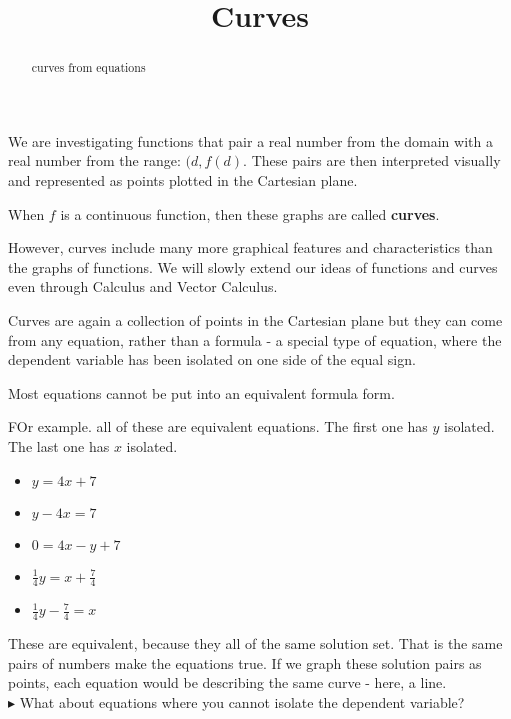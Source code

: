 \documentclass{ximera}
\title{Curves}
\begin{document}
\begin{abstract}
curves from equations
\end{abstract}
\maketitle





We are investigating functions that pair a real number from the domain with a real number from the range: $(d, f(d)$.  These pairs are then interpreted visually and represented as points plotted in the Cartesian plane.

When $f$ is a continuous function, then these graphs are called \textbf{curves}.



However, curves include many more graphical features and characteristics than the graphs of functions.  We will slowly extend our ideas of functions and curves even through Calculus and Vector Calculus.

Curves are again a collection of points in the Cartesian plane but they can come from any equation, rather than a formula - a special type of equation, where the dependent variable has been isolated on one side of the equal sign.


Most equations cannot be put into an equivalent formula form.



FOr example. all of these are equivalent equations.  The first one has $y$ isolated.  The last one has $x$ isolated.


\begin{itemize}
\item $y = 4 x + 7$
\item $y - 4x = 7$
\item $0 = 4x - y + 7$
\item $\frac{1}{4}y = x + \frac{7}{4}$
\item $\frac{1}{4}y - \frac{7}{4}= x$
\end{itemize}


These are equivalent, because they all of the same solution set.  That is the same pairs of numbers make the equations true.  If we graph these solution pairs as points, each equation would be describing the same curve - here, a line. \\



$\blacktriangleright$ What about equations where you cannot isolate the dependent variable? \\
\end{document}
